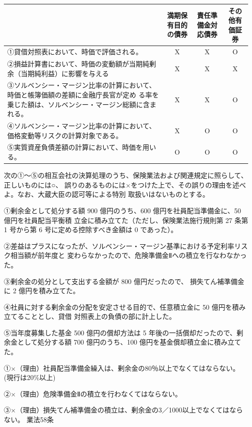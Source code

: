 \documentclass[report,gutter=10mm,fore-edge=10mm,uplatex,dvipdfmx]{jlreq}
\begin{document}
\answer{}

\begin{tabularx}{\textwidth}{|X|c|c|c|}
\hline
 & 満期保有目的の債券&責任準備金対応債券&その他有価証券 \\ \hline
①貸借対照表において、時価で評価される。 & X & X&O \\ \hline
②損益計算書において、時価の変動額が当期純剰余（当期純利益）に影響を与える& X&X &X \\ \hline
③ソルベンシー・マージン比率の計算において、時価と帳簿価額の差額に金融庁長官が定め
る率を乗じた額は、ソルベンシー・マージン総額に含まれる。&X &X &O \\ \hline
④ソルベンシー・マージン比率の計算において、価格変動等リスクの計算対象である。& X&O &O \\ \hline
⑤実質資産負債差額の計算において、時価を用いる。&O &O &O \\ \hline
\end{tabularx}


次の①～⑤の相互会社の決算処理のうち、保険業法および関連規定に照らして、正しいものには○、
誤りのあるものには×をつけた上で、その誤りの理由を述べよ。なお、大蔵大臣の認可等による特別
取扱いはないものとする。

①剰余金として処分する額 900 億円のうち、600 億円を社員配当準備金に、50 億円を社員配当平衡積
立金に積み立てた（ただし、保険業法施行規則第 27 条第 1 号から第 6 号に定める控除すべき金額は
0 であった）。

②差益はプラスになったが、ソルベンシー・マージン基準における予定利率リスク相当額が前年度と
変わらなかったので、危険準備金Ⅱへの積立を行なわなかった。

③剰余金の処分として支出する金額が 800 億円だったので、
損失てん補準備金に 2 億円を積み立てた。

④社員に対する剰余金の分配を安定させる目的で、任意積立金に 50 億円を積み立てることとし、貸借
対照表上の負債の部に計上した。

⑤当年度募集した基金 500 億円の償却方法は 5 年後の一括償却だったので、剰余金として処分する額
700 億円のうち、100 億円を基金償却積立金に積み立てた。

\answer{}

①×（理由）社員配当準備金繰入は、剰余金の80％以上でなくてはならない。
(現行は20\%以上)

②×（理由）危険準備金Ⅱの積立を行わなくてはならない。

③×（理由）損失てん補準備金の積立は、剰余金の3／1000以上でなくてはならない。
業法58条
\end{document}
